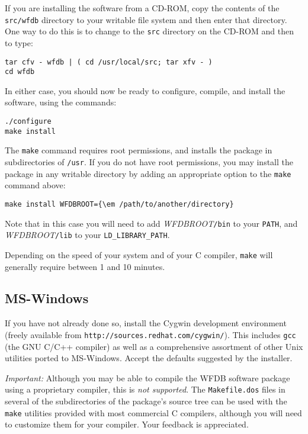 \documentclass[twoside]{article}
\begin{document}
If you are installing the software from a CD-ROM, copy the contents of the
{\tt src/wfdb} directory to your writable file system and then enter that
directory.  One way to do this is to change to the {\tt src} directory on the
CD-ROM and then to type:

\begin{verbatim}
tar cfv - wfdb | ( cd /usr/local/src; tar xfv - )
cd wfdb
\end{verbatim}

In either case, you should now be ready to configure, compile, and install
the software, using the commands:

\begin{verbatim}
./configure
make install
\end{verbatim}

The {\tt make} command requires root permissions, and installs the package
in subdirectories of {\tt /usr}.  If you do not have root permissions,
you may install the package in any writable directory by adding an
appropriate option to the {\tt make} command above:

\begin{verbatim}
make install WFDBROOT={\em /path/to/another/directory}
\end{verbatim}

Note that in this case you will need to add {\em WFDBROOT}{\tt /bin}
to your {\tt PATH}, and {\em WFDBROOT}{\tt /lib} to your
{\tt LD\_LIBRARY\_PATH}.

Depending on the speed of your system and of your C compiler, {\tt make} will
generally require between 1 and 10 minutes.

\subsection*{MS-Windows}

If you have not already done so, install the Cygwin development environment
(freely available from {\tt http://sources.redhat.com/cygwin/}).  This includes
{\tt gcc} (the GNU C/C++ compiler) as well as a comprehensive assortment of
other Unix utilities ported to MS-Windows.  Accept the defaults suggested by
the installer.

\emph{Important:} Although you may be able to compile the WFDB software
package using a proprietary compiler, this is \emph{not supported}.  The
{\tt Makefile.dos} files in several of the subdirectories of the package's
source tree can be used with the {\tt make} utilities provided with most
commercial C compilers, although you will need to customize them for your
compiler. Your feedback is appreciated.
\end{document}
